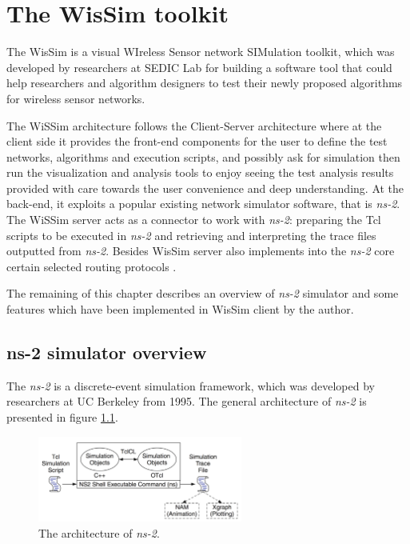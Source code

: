 \chapter{The WisSim toolkit}\label{chapter5}
The WisSim is a visual WIreless Sensor network SIMulation toolkit, which was developed by researchers at SEDIC Lab \cite{sedic} for building a software tool that could help researchers and algorithm designers to test their newly proposed algorithms for wireless sensor networks. 

The WiSSim architecture follows the Client-Server architecture where at the client side it provides the front-end components for the user to define the test networks, algorithms and execution scripts, and possibly ask for simulation then run the visualization and analysis tools to enjoy seeing the test analysis results provided with care towards the user convenience and deep understanding. At the back-end, it exploits a popular existing network simulator software, that is \emph{ns-2}. The WiSSim server acts as a connector to work with \emph{ns-2}: preparing the Tcl scripts to be executed in \emph{ns-2} and retrieving and interpreting the trace files outputted from \emph{ns-2}. Besides WisSim server also implements into the \emph{ns-2} core certain selected routing protocols \cite{sedic}.

The remaining of this chapter describes an overview of \emph{ns-2} simulator and some features which have been implemented in WisSim client by the author.

\section{ns-2 simulator overview}
The \emph{ns-2} is a discrete-event simulation framework, which was developed by researchers at UC Berkeley from 1995. The general architecture of \emph{ns-2} is presented in figure \ref{fig-ns2-arch}. 
\begin{figure}[!htb]
\centering
\includegraphics[width=0.6\textwidth]{Chapter5/Chapter5Figs/fig-ns2-arch.png}
\caption{The architecture of \emph{ns-2}.}
\label{fig-ns2-arch}
\end{figure} 

